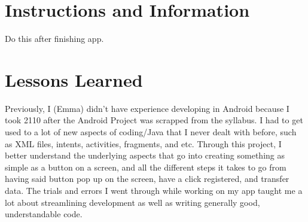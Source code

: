 \documentclass[12pt]{article}
\begin{document}
\maketitle

\section{Instructions and Information}
Do this after finishing app.

\section{Lessons Learned}
Previously, I (Emma) didn't have experience developing in Android because I took 2110 after the Android Project was scrapped from the syllabus. I had to get used to a lot of new aspects of coding/Java that I never dealt with before, such as XML files, intents, activities, fragments, and etc. Through this project, I better understand the underlying aspects that go into creating something as simple as a button on a screen, and all the different steps it takes to go from having said button pop up on the screen, have a click registered, and transfer data. The trials and errors I went through while working on my app taught me a lot about streamlining development as well as writing generally good, understandable code.
\end{document}
